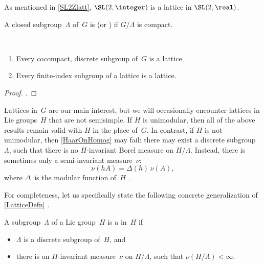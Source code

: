 \begin{eg}
 As mentioned in \cref{SL2Zlatt}, $\SL(2,\integer)$ is
a lattice in $\SL(2,\real)$.
 \end{eg}

\begin{defn}
 A closed subgroup~$\Lambda$ of~$G$ is
 (or
) if $G/\Lambda$ is compact.
 \end{defn}

\begin{cor} \label{Latt<>cpct/finind} \ 
 \noprelistbreak
 \begin{enumerate}
 \item \label{Latt<>cpct/finind-cpct}
 Every cocompact, discrete subgroup of~$G$ is a lattice.
 \item \label{Latt<>cpct/finind-finind}
 Every finite-index subgroup of a lattice is a lattice.
 \end{enumerate}
 \end{cor}

\begin{proof}
 .
 \end{proof}

\begin{rem}
 Lattices in~$G$ are our main interest, but we will
occasionally encounter lattices in Lie groups~$H$ that
are not semisimple. If $H$ is unimodular, then all of the
above results remain valid with $H$ in the place of~$G$.
In contrast, if $H$ is not unimodular, then
\cref{HaarOnHomog} may fail: there may exist a discrete subgroup~$\Lambda$, such that there is no
$H$-invariant Borel measure on $H/\Lambda$.
Instead, there is sometimes only a semi-invariant
measure~$\nu$:
 $$ \nu(hA) = \Delta(h) \, \nu(A) ,$$
 where $\Delta$~is the modular function of~$H$
. 
 \end{rem}

For completeness, let us specifically state the following
concrete generalization of \cref{LatticeDefn}
.

\begin{defn} \label{LatticeGeneralDefn}
 A subgroup~$\Lambda$ of a Lie group~$H$ is a
 in~$H$ if
 \begin{itemize}
 \item $\Lambda$ is a discrete subgroup of~$H$, and
 \item there is an $H$-invariant measure~$\nu$ on $H/\Lambda$, such that $\nu(H/\Lambda) < \infty$.
 \end{itemize}
 \end{defn}

